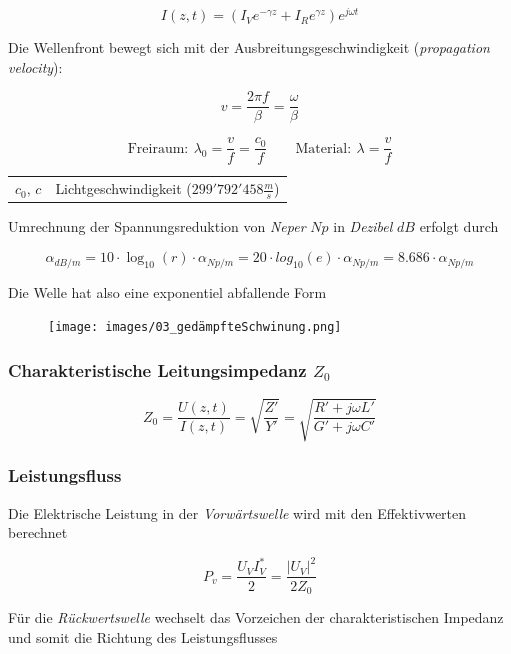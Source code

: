 \documentclass[
  10pt,
  a4paper,
  german]{article}
\makeatletter
\numberwithin{equation}{section}
\newenvironment{conditions}
  {\par\vspace{\abovedisplayskip}\noindent\begin{tabular}{>{$}l<{$} @{${}:{}$} l}}
  {\end{tabular}\par\vspace{\belowdisplayskip}}
\makeatother
\begin{document}
\[
I(z,t)=(I_Ve^{-\gamma z}+I_Re^{\gamma z})e^{j\omega t}
\]

Die Wellenfront bewegt sich mit der Ausbreitungsgeschwindigkeit
(\emph{propagation velocity}):

\[
v=\frac{2\pi f}{\beta} = \frac{\omega}{\beta}
\]

\[
\text{Freiraum}:\ \lambda_0=\frac{v}{f}=\frac{c_0}{f} \qquad \text{Material}:\ \lambda = \frac{v}{f}
\]

\begin{conditions}
  c_0,\,c & Lichtgeschwindigkeit ($299'792'458 \tfrac{m}{s}$)
\end{conditions}

Umrechnung der Spannungsreduktion von \emph{Neper} \(Np\) in
\emph{Dezibel} \(dB\) erfolgt durch

\[
\alpha_{dB/m}=10\cdot\log_{10}(r)\cdot\alpha_{Np/m}=20\cdot log_{10}(e)
\cdot\alpha_{Np/m}
=8.686\cdot\alpha_{Np/m}
\]

Die Welle hat also eine exponentiel abfallende Form

\begin{figure}[H]

{\centering \texttt{[image: images/03\_gedämpfteSchwinung.png]}

}

\end{figure}

\hypertarget{charakteristische-leitungsimpedanz-z_0}{%
\subsubsection{\texorpdfstring{Charakteristische Leitungsimpedanz
\(Z_0\)}{Charakteristische Leitungsimpedanz Z\_0}}\label{charakteristische-leitungsimpedanz-z_0}}

\[
Z_0=\frac{U(z,t)}{I(z,t)}=\sqrt{\frac{Z'}{Y'}}=\sqrt{\frac{R'+j\omega L'}{G'+j\omega C'}}
\]

\hypertarget{leistungsfluss}{%
\subsubsection{Leistungsfluss}\label{leistungsfluss}}

Die Elektrische Leistung in der \emph{Vorwärtswelle} wird mit den
Effektivwerten berechnet

\[
P_v=\frac{U_VI_V^*}{2}=\frac{|U_V|^2}{2Z_0}
\]

Für die \emph{Rückwertswelle} wechselt das Vorzeichen der
charakteristischen Impedanz und somit die Richtung des Leistungsflusses
\end{document}
